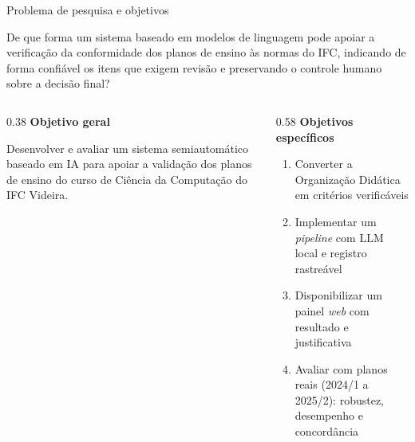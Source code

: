 \documentclass[aspectratio=169,11pt,xcolor=table]{beamer}
\begin{document}
\begin{frame}{Problema de pesquisa e objetivos}
  \vspace{-0.2cm}
  \begin{cartao}[title={Problema de pesquisa}]
    \footnotesize De que forma um sistema baseado em modelos de linguagem pode apoiar a verificação
    da conformidade dos planos de ensino às normas do IFC, indicando de forma confiável os
    itens que exigem revisão e preservando o controle humano sobre a decisão final?
  \end{cartao}
  \smallskip
  \begin{columns}[T]
    \begin{column}{0.38\textwidth}
      {\bfseries Objetivo geral}\par\smallskip
      \footnotesize Desenvolver e avaliar um sistema semiautomático baseado em IA para apoiar a
      validação dos planos de ensino do curso de Ciência da Computação do IFC Videira.
    \end{column}
    \begin{column}{0.58\textwidth}
      {\bfseries Objetivos específicos}\par\smallskip
      \begin{enumerate}\footnotesize\setlength\itemsep{0.15em}
        \item Converter a Organização Didática em critérios verificáveis
        \item Implementar um \textit{pipeline} com LLM local e registro rastreável
        \item Disponibilizar um painel \textit{web} com resultado e justificativa
        \item Avaliar com planos reais (2024/1 a 2025/2): robustez, desempenho e concordância
      \end{enumerate}
    \end{column}
  \end{columns}
\end{frame}

\end{document}
